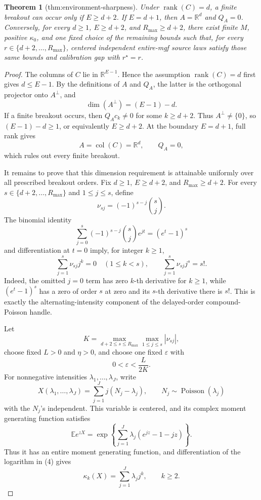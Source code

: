 \documentclass{article}
\newtheorem{theorem}{Theorem}
\begin{document}
\begin{theorem}[thm:environment-sharpness]\label{thm:environment-sharpness}
Under \(\operatorname{rank}(C)=d\), a finite breakout can occur only if \(E\ge d+2\).  If \(E=d+1\), then \(A=\mathbb R^d\) and \(Q_A=0\).  Conversely, for every \(d\ge1\), \(E\ge d+2\), and \(R_{\max}\ge d+2\), there exist finite \(M\), positive \(\kappa_0\), and one fixed choice of the remaining bounds such that, for every \(r\in\{d+2,\ldots,R_{\max}\}\), centered independent entire-mgf source laws satisfy those same bounds and calibration gap with \(r^\star=r\).
\end{theorem}
\begin{proof}
The columns of \(C\) lie in \(\mathbb R^{E-1}\).  Hence the assumption \(\operatorname{rank}(C)=d\) first gives \(d\leq E-1\).  By the definitions of \(A\) and \(Q_A\), the latter is the orthogonal projector onto \(A^\perp\), and
\[
 \dim(A^\perp)=(E-1)-d.
\]
If a finite breakout occurs, then \(Q_Ac_k\neq0\) for some \(k\geq d+2\).  Thus \(A^\perp\neq\{0\}\), so \((E-1)-d\geq1\), or equivalently \(E\geq d+2\).  At the boundary \(E=d+1\), full rank gives
\[
 A=\operatorname{col}(C)=\mathbb R^d,
 \qquad
 Q_A=0,
\]
which rules out every finite breakout.

It remains to prove that this dimension requirement is attainable uniformly over all prescribed breakout orders.  Fix \(d\geq1\), \(E\geq d+2\), and \(R_{\max}\geq d+2\).  For every \(s\in\{d+2,\ldots,R_{\max}\}\) and \(1\leq j\leq s\), define
\[
 \nu_{s j}=(-1)^{s-j}{s\choose j}.
\]
The binomial identity
\[
 \sum_{j=0}^{s}(-1)^{s-j}{s\choose j}e^{jt}=(e^t-1)^s
\]
and differentiation at \(t=0\) imply, for integer \(k\geq1\),
\[
 \sum_{j=1}^{s}\nu_{s j}j^k=0\quad(1\leq k<s),
 \qquad
 \sum_{j=1}^{s}\nu_{s j}j^s=s!.
 \tag{2}
\]
Indeed, the omitted \(j=0\) term has zero \(k\)-th derivative for \(k\geq1\), while \((e^t-1)^s\) has a zero of order \(s\) at zero and its \(s\)-th derivative there is \(s!\).  This is exactly the alternating-intensity component of the delayed-order compound-Poisson handle.

Let
\[
 K=\max_{d+2\leq s\leq R_{\max}}\max_{1\leq j\leq s}|\nu_{s j}|,
\]
choose fixed \(L>0\) and \(\eta>0\), and choose one fixed \(\varepsilon\) with
\[
 0<\varepsilon<\frac{L}{2K}.
 \tag{3}
\]
For nonnegative intensities \(\lambda_1,\ldots,\lambda_J\), write
\[
 X(\lambda_1,\ldots,\lambda_J)
 =\sum_{j=1}^J j(N_j-\lambda_j),
 \qquad N_j\sim\operatorname{Poisson}(\lambda_j)
\]
with the \(N_j\)'s independent.  This variable is centered, and its complex moment generating function satisfies
\[
 \mathbb E e^{zX}
 =\exp\!\left\{\sum_{j=1}^J\lambda_j(e^{jz}-1-jz)\right\}.
 \tag{4}
\]
Thus it has an entire moment generating function, and differentiation of the logarithm in (4) gives
\[
 \kappa_k(X)=\sum_{j=1}^J\lambda_jj^k,
 \qquad k\geq2.
 \tag{5}
\]


\end{proof}
\end{document}
